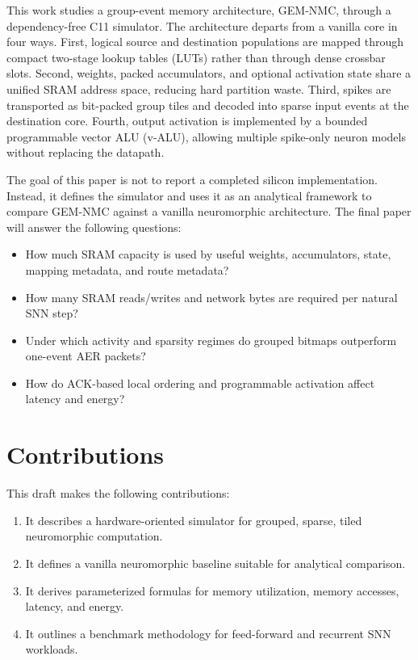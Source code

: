 \documentclass[10pt,conference]{IEEEtran}
\newcommand{\arch}{GEM-NMC}
\begin{document}
This work studies a group-event memory architecture, \arch{}, through a dependency-free C11 simulator. The architecture departs from a vanilla core in four ways. First, logical source and destination populations are mapped through compact two-stage lookup tables (LUTs) rather than through dense crossbar slots. Second, weights, packed accumulators, and optional activation state share a unified SRAM address space, reducing hard partition waste. Third, spikes are transported as bit-packed group tiles and decoded into sparse input events at the destination core. Fourth, output activation is implemented by a bounded programmable vector ALU (v-ALU), allowing multiple spike-only neuron models without replacing the datapath.

The goal of this paper is not to report a completed silicon implementation. Instead, it defines the simulator and uses it as an analytical framework to compare \arch{} against a vanilla neuromorphic architecture. The final paper will answer the following questions:
\begin{itemize}
    \item How much SRAM capacity is used by useful weights, accumulators, state, mapping metadata, and route metadata?
    \item How many SRAM reads/writes and network bytes are required per natural SNN step?
    \item Under which activity and sparsity regimes do grouped bitmaps outperform one-event AER packets?
    \item How do ACK-based local ordering and programmable activation affect latency and energy?
\end{itemize}

\section{Contributions}
This draft makes the following contributions:
\begin{enumerate}
    \item It describes a hardware-oriented simulator for grouped, sparse, tiled neuromorphic computation.
    \item It defines a vanilla neuromorphic baseline suitable for analytical comparison.
    \item It derives parameterized formulas for memory utilization, memory accesses, latency, and energy.
    \item It outlines a benchmark methodology for feed-forward and recurrent SNN workloads.
\end{enumerate}
\end{document}
